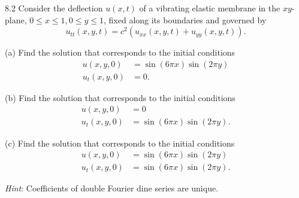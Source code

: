 \begin{problem}{8.2}
  Consider the deflection $u(x,t)$ of a vibrating elastic membrane in the $xy$-plane, $0 \leq x \leq 1, 0 \leq y \leq 1$, fixed along its boundaries and governed by
  \[ 
  u_{t t}(x,y,t) = c^2 \left( u_{x x}(x,y,t) + u_{yy}(x,y,t) \right)
  .\]

  (a) Find the solution that corresponds to the initial conditions
  \begin{align*}
    u(x,y,0) &= \sin \left( 6 \pi x \right) \sin \left( 2 \pi y \right) \\
    u_t(x,y,0) &= 0
  .\end{align*}

  (b) Find the solution that corresponds to the initial conditions
  \begin{align*}
    u(x,y,0) &= 0 \\
    u_t(x,y,0) &= \sin \left( 6 \pi x \right) \sin \left( 2 \pi y \right)
  .\end{align*}

  (c) Find the solution that corresponds to the initial conditions
  \begin{align*}
    u(x,y,0) &= \sin \left( 6 \pi x \right) \sin \left( 2 \pi y \right) \\
    u_t(x,y,0) &= \sin \left( 6 \pi x \right) \sin \left( 2 \pi y \right)
  .\end{align*}

  \textit{Hint}: Coefficients of double Fourier dine series are unique.
\end{problem}


